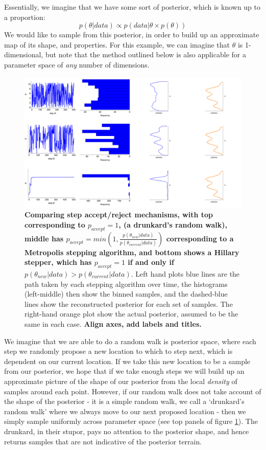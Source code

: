 \documentclass[11pt,fullpage]{book}
\begin{document}
Essentially, we imagine that we have some sort of posterior, which is known up to a proportion:
%
\begin{equation}
p(\theta|data) \propto p(data|\theta \times p(\theta))
\end{equation}
%
We would like to sample from this posterior, in order to build up an approximate map of its shape, and properties. For this example, we can imagine that $\theta$ is 1-dimensional, but note that the method outlined below is also applicable for a parameter space of \textit{any} number of dimensions.

\begin{figure}
\centerline{\includegraphics[width=1.5\textwidth]{metropolisHastings_definingMetropolis.pdf}}
\caption{\textbf{Comparing step accept/reject mechanisms, with top corresponding to $p_{accept}=1$, (a drunkard's random walk), middle has $p_{accept}=min(1,\frac{p(\theta_{new}|data)}{p(\theta_{current}|data)})$ corresponding to a Metropolis stepping algorithm, and bottom shows a Hillary stepper, which has $p_{accept}=1$ if and only if $p(\theta_{new}|data)>p(\theta_{current}|data)$}. Left hand plots blue lines are the path taken by each stepping algorithm over time, the histograms (left-middle) then show the binned samples, and the dashed-blue lines show the reconstructed posterior for each set of samples. The right-hand orange plot show the actual posterior, assumed to be the same in each case. \textbf{Align axes, add labels and titles.}}\label{fig:metropolisHastings_definingMetropolis}
\end{figure}

We imagine that we are able to do a random walk is posterior space, where each step we randomly propose a new location to which to step next, which is dependent on our current location. If we take this new location to be a sample from our posterior, we hope that if we take enough steps we will build up an approximate picture of the shape of our posterior from the local \textit{density} of samples around each point. However, if our random walk does not take account of the shape of the posterior - it is a simple random walk, we call a `drunkard's random walk' where we always move to our next proposed location - then we simply sample uniformly across parameter space (see top panels of figure \ref{fig:metropolisHastings_definingMetropolis}). The drunkard, in their stupor, pays no attention to the posterior shape, and hence returns samples that are not indicative of the posterior terrain.
\end{document}

